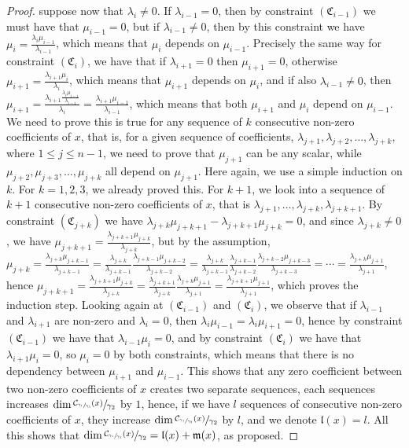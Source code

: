 \documentclass[12pt]{article}
\begin{document}
\begin{proof}
suppose now that $\lambda_i\neq 0$. If $\lambda_{i-1}=0$, then by constraint $(\mathfrak{C}_{i-1})$ we must have that $\mu_{i-1}=0$, but if $\lambda_{i-1}\neq 0$, then by this constraint we have $\mu_i=\frac{\lambda_i\mu_{i-1}}{\lambda_{i-1}}$, which means that $\mu_i$ depends on $\mu_{i-1}$. Precisely the same way for constraint $(\mathfrak{C}_i)$, we have that if $\lambda_{i+1}=0$ then $\mu_{i+1}=0$, otherwise $\mu_{i+1}=\frac{\lambda_{i+1}\mu_i}{\lambda_i}$, which means that $\mu_{i+1}$ depends on $\mu_i$, and if also $\lambda_{i-1}\neq 0$, then $\mu_{i+1}=\frac{\lambda_{i+1}\frac{\lambda_i\mu_{i-1}}{\lambda_{i-1}}}{\lambda_i}=\frac{\lambda_{i+1}\mu_{i-1}}{\lambda_{i-1}}$, which means that both $\mu_{i+1}$ and $\mu_i$ depend on $\mu_{i-1}$. We need to prove this is true for any sequence of $k$ consecutive non-zero coefficients of $x$, that is, for a given sequence of coefficients, $\lambda_{j+1},\lambda_{j+2},\dots,\lambda_{j+k}$, where $1\leq j\leq n-1$, we need to prove that $\mu_{j+1}$ can be any scalar, while $\mu_{j+2},\mu_{j+3},\dots,\mu_{j+k}$ all depend on $\mu_{j+1}$. Here again, we use a simple induction on $k$. For $k=1,2,3$, we already proved this. For $k+1$, we look into a sequence of $k+1$ consecutive non-zero coefficients of $x$, that is $\lambda_{j+1},\dots,\lambda_{j+k},\lambda_{j+k+1}$. By constraint $(\mathfrak{C}_{j+k})$ we have $\lambda_{j+k}\mu_{j+k+1}-\lambda_{j+k+1}\mu_{j+k}=0$, and since $\lambda_{j+k}\neq 0$, we have $\mu_{j+k+1}=\frac{\lambda_{j+k+1}\mu_{j+k}}{\lambda_{j+k}}$, but by the assumption, $\mu_{j+k}=\frac{\lambda_{j+k}\mu_{j+k-1}}{\lambda_{j+k-1}}=\frac{\lambda_{j+k}}{\lambda_{j+k-1}}\frac{\lambda_{j+k-1}\mu_{j+k-2}}{\lambda_{j+k-2}}=\frac{\lambda_{j+k}}{\lambda_{j+k-1}}\frac{\lambda_{j+k-1}}{\lambda_{j+k-2}}\frac{\lambda_{j+k-2}\mu_{j+k-3}}{\lambda_{j+k-3}}=\cdots=\frac{\lambda_{j+k}\mu_{j+1}}{\lambda_{j+1}}$, hence $\mu_{j+k+1}=\frac{\lambda_{j+k+1}\mu_{j+k}}{\lambda_{j+k}}=\frac{\lambda_{j+k+1}}{\lambda_{j+k}}\frac{\lambda_{j+k}\mu_{j+1}}{\lambda_{j+1}}=\frac{\lambda_{j+k+1}\mu_{j+1}}{\lambda_{j+1}}$, which proves the induction step. Looking again at $(\mathfrak{C}_{i-1})$ and $(\mathfrak{C}_i)$, we observe that if $\lambda_{i-1}$ and $\lambda_{i+1}$ are non-zero and $\lambda_i=0$, then $\lambda_i\mu_{i-1}=\lambda_i\mu_{i+1}=0$, hence by constraint $(\mathfrak{C}_{i-1})$ we have that $\lambda_{i-1}\mu_i=0$, and by constraint $(\mathfrak{C}_i)$ we have that $\lambda_{i+1}\mu_i=0$, so $\mu_i=0$ by both constraints, which means that there is no dependency between $\mu_{i+1}$ and $\mu_{i-1}$. This shows that any zero coefficient between two non-zero coefficients of $x$ creates two separate sequences, each sequences increases $\dim\sfrac{\mathcal{C}_{\sfrac{\gamma_1}{\gamma_3}}(x)}{\gamma_2}$ by $1$, hence, if we have $l$ sequences of consecutive non-zero coefficients of $x$, they increase $\dim\sfrac{\mathcal{C}_{\sfrac{\gamma_1}{\gamma_3}}(x)}{\gamma_2}$ by $l$, and we denote $\mathfrak{l}(x)=l$. All this shows that $\dim\sfrac{\mathcal{C}_{\sfrac{\gamma_1}{\gamma_3}}(x)}{\gamma_2}=\mathfrak{l}(x)+\mathfrak{m}(x)$, as proposed.
\end{proof}
\end{document}
